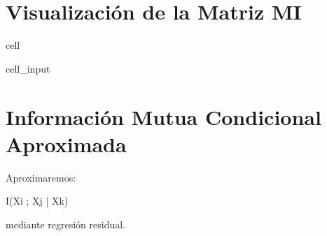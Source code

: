 \documentclass[letterpaper,10pt,english]{jupyterBook}
\begin{document}
\section{Visualización de la Matriz MI}
\label{\detokenize{03_multivariate_models/high_dimensional:visualizacion-de-la-matriz-mi}}
\begin{sphinxuseclass}{cell}\begin{sphinxVerbatimInput}

\begin{sphinxuseclass}{cell_input}
\begin{sphinxVerbatim}[commandchars=\\\{\}]


 
 

\end{sphinxVerbatim}

\end{sphinxuseclass}\end{sphinxVerbatimInput}

\end{sphinxuseclass}

\section{Información Mutua Condicional Aproximada}
\label{\detokenize{03_multivariate_models/high_dimensional:informacion-mutua-condicional-aproximada}}
\sphinxAtStartPar
Aproximaremos:

\sphinxAtStartPar
I(Xi ; Xj | Xk)

\sphinxAtStartPar
mediante regresión residual.
\end{document}

